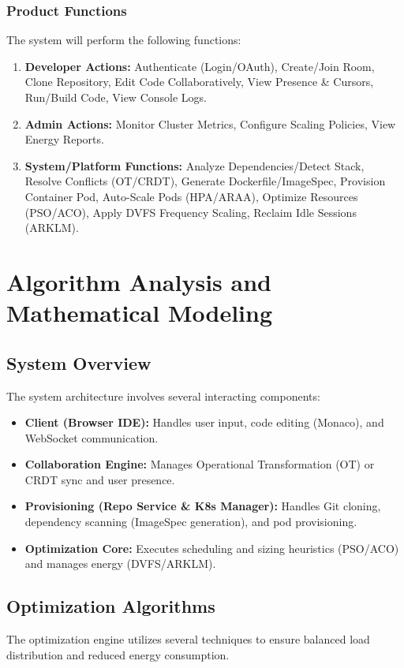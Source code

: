 \documentclass[12pt,a4paper]{report}
\begin{document}
\subsection{Product Functions}
The system will perform the following functions:
\begin{enumerate}
    \item \textbf{Developer Actions:} Authenticate (Login/OAuth), Create/Join Room, Clone Repository, Edit Code Collaboratively, View Presence \& Cursors, Run/Build Code, View Console Logs.
    \item \textbf{Admin Actions:} Monitor Cluster Metrics, Configure Scaling Policies, View Energy Reports.
    \item \textbf{System/Platform Functions:} Analyze Dependencies/Detect Stack, Resolve Conflicts (OT/CRDT), Generate Dockerfile/ImageSpec, Provision Container Pod, Auto-Scale Pods (HPA/ARAA), Optimize Resources (PSO/ACO), Apply DVFS Frequency Scaling, Reclaim Idle Sessions (ARKLM).
\end{enumerate}

\chapter{Algorithm Analysis and Mathematical Modeling}
\section{System Overview}
The system architecture involves several interacting components:
\begin{itemize}
    \item \textbf{Client (Browser IDE):} Handles user input, code editing (Monaco), and WebSocket communication.
    \item \textbf{Collaboration Engine:} Manages Operational Transformation (OT) or CRDT sync and user presence.
    \item \textbf{Provisioning (Repo Service \& K8s Manager):} Handles Git cloning, dependency scanning (ImageSpec generation), and pod provisioning.
    \item \textbf{Optimization Core:} Executes scheduling and sizing heuristics (PSO/ACO) and manages energy (DVFS/ARKLM).
\end{itemize}

\section{Optimization Algorithms}
The optimization engine utilizes several techniques to ensure balanced load distribution and reduced energy consumption.
\end{document}
